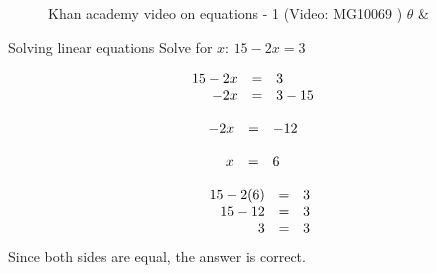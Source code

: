 
\setcounter{subfigure}{0}
\begin{figure}[H] %
\textnormal{Khan academy video on equations - 1}\vspace{.1in} \nopagebreak
\label{m39241*yt-media1}\label{m39241*yt-video1}
 { (Video:  MG10069 )}
\vspace{2pt}   $\theta $
    &

\vspace{.1in}
\end{figure}       

    
\begin{wex}{Solving linear equations }
{
Solve for $x$: $15-2x=3$
}
{

\begin{equation*}
    \begin{array}{cclc}\hfill 15-2x& =& 3\hfill & \\
	    \hfill -2x& =& 3-15\hfill & \hfill 
	    
    \end{array}
\end{equation*}

\begin{equation*}
    \begin{array}{cccc}\hfill -2x& =&-12\hfill & 
	    
    \end{array}
\end{equation*}

\begin{equation*}
    \begin{array}{cccc}\hfill x& =&6\hfill & 
	    
    \end{array}
\end{equation*}

\begin{equation*}
\begin{array}{ccc}\hfill 15 - 2(6)& =& 3\hfill \\
 \hfill 15-12& =& 3\hfill \\
\hfill 3 &=& 3\hfill
\end{array}
\end{equation*}
Since both sides are equal, the answer is correct. 
}
\end{wex}

